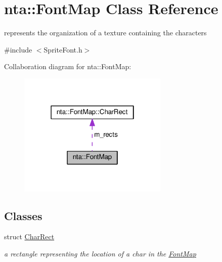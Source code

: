 \hypertarget{classnta_1_1FontMap}{}\section{nta\+:\+:Font\+Map Class Reference}
\label{classnta_1_1FontMap}


represents the organization of a texture containing the characters  




{\ttfamily \#include $<$Sprite\+Font.\+h$>$}



Collaboration diagram for nta\+:\+:Font\+Map\+:
\nopagebreak
\begin{figure}[H]
\begin{center}
\leavevmode
\includegraphics[width=202pt]{d3/d2b/classnta_1_1FontMap__coll__graph}
\end{center}
\end{figure}
\subsection*{Classes}
\begin{DoxyCompactItemize}
\item 
struct \hyperlink{structnta_1_1FontMap_1_1CharRect}{Char\+Rect}
\begin{DoxyCompactList}\small\item\em a rectangle representing the location of a char in the \hyperlink{classnta_1_1FontMap}{Font\+Map} \end{DoxyCompactList}\end{DoxyCompactItemize}
